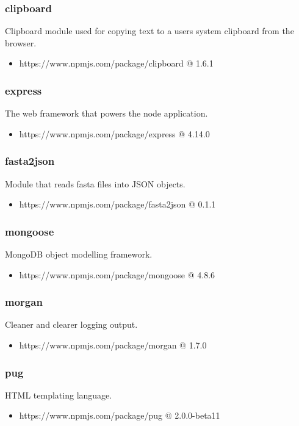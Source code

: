   \subsubsection{clipboard}
  Clipboard module used for copying text to a users system clipboard from the browser.
  \begin{itemize}
    \item https://www.npmjs.com/package/clipboard @ 1.6.1
  \end{itemize}

  \subsubsection{express}
  The web framework that powers the node application.
  \begin{itemize}
    \item https://www.npmjs.com/package/express @ 4.14.0
  \end{itemize}

  \subsubsection{fasta2json}
  Module that reads fasta files into JSON objects.
  \begin{itemize}
    \item https://www.npmjs.com/package/fasta2json @ 0.1.1
  \end{itemize}

  \subsubsection{mongoose}
  MongoDB object modelling framework.
  \begin{itemize}
    \item https://www.npmjs.com/package/mongoose @ 4.8.6
  \end{itemize}

  \subsubsection{morgan}
  Cleaner and clearer logging output.
  \begin{itemize}
    \item https://www.npmjs.com/package/morgan @ 1.7.0
  \end{itemize}

  \subsubsection{pug}
  HTML templating language.
  \begin{itemize}
    \item https://www.npmjs.com/package/pug @ 2.0.0-beta11
  \end{itemize}

